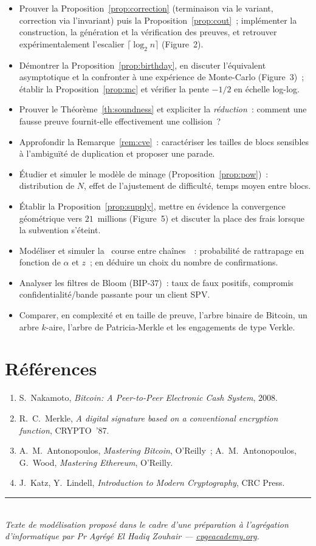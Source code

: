 \documentclass[11pt,a4paper]{article}
\theoremstyle{definition}\newtheorem{definition}{Définition}
\theoremstyle{plain}\newtheorem{theoreme}{Théorème}\newtheorem{proposition}{Proposition}
\theoremstyle{remark}\newtheorem{remarque}{Remarque}
\begin{document}
\begin{itemize}[nosep,leftmargin=1.3em]
  \item Prouver la Proposition~\ref{prop:correction} (terminaison via le variant, correction via
        l'invariant) puis la Proposition~\ref{prop:cout}~; implémenter la construction, la
        génération et la vérification des preuves, et retrouver expérimentalement l'escalier
        $\lceil\log_2 n\rceil$ (Figure~2).
  \item Démontrer la Proposition~\ref{prop:birthday}, en discuter l'équivalent asymptotique et la
        confronter à une expérience de Monte-Carlo (Figure~3)~; établir la
        Proposition~\ref{prop:mc} et vérifier la pente $-1/2$ en échelle log-log.
  \item Prouver le Théorème~\ref{th:soundness} et expliciter la \emph{réduction}~: comment une
        fausse preuve fournit-elle effectivement une collision~?
  \item Approfondir la Remarque~\ref{rem:cve}~: caractériser les tailles de blocs sensibles à
        l'ambiguïté de duplication et proposer une parade.
  \item Étudier et simuler le modèle de minage (Proposition~\ref{prop:pow})~: distribution de $N$,
        effet de l'ajustement de difficulté, temps moyen entre blocs.
  \item Établir la Proposition~\ref{prop:supply}, mettre en évidence la convergence géométrique
        vers $21$~millions (Figure~5) et discuter la place des frais lorsque la subvention s'éteint.
  \item Modéliser et simuler la \guillemotleft~course entre chaînes~\guillemotright{}~: probabilité
        de rattrapage en fonction de $\alpha$ et $z$~; en déduire un choix du nombre de confirmations.
  \item Analyser les filtres de Bloom (BIP-37)~: taux de faux positifs, compromis
        confidentialité/bande passante pour un client SPV.
  \item Comparer, en complexité et en taille de preuve, l'arbre binaire de Bitcoin, un arbre
        $k$-aire, l'arbre de Patricia-Merkle et les engagements de type Verkle.
\end{itemize}

\section*{Références}
\begin{enumerate}[nosep,leftmargin=1.6em]
  \item S.~Nakamoto, \emph{Bitcoin: A Peer-to-Peer Electronic Cash System}, 2008.
  \item R.~C.~Merkle, \emph{A digital signature based on a conventional encryption function}, CRYPTO~'87.
  \item A.~M.~Antonopoulos, \emph{Mastering Bitcoin}, O'Reilly~; A.~M.~Antonopoulos, G.~Wood,
        \emph{Mastering Ethereum}, O'Reilly.
  \item J.~Katz, Y.~Lindell, \emph{Introduction to Modern Cryptography}, CRC Press.
\end{enumerate}

\vfill
\noindent\rule{\linewidth}{0.3pt}\\
{\footnotesize\itshape Texte de modélisation proposé dans le cadre d'une préparation à
l'agrégation d'informatique par Pr Agrégé El Hadiq Zouhair --- \href{https://cpgeacademy.org}{cpgeacademy.org}.}
\end{document}
